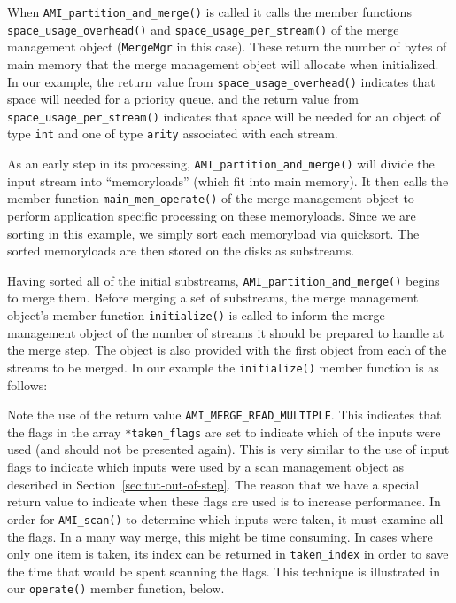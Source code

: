 When \lstinline|AMI_partition_and_merge()| is called it calls the
member functions \lstinline|space_usage_overhead()| and
\lstinline|space_usage_per_stream()| of the merge management object
(\lstinline|MergeMgr| in this case).  These return the number of bytes
of main memory that the merge management object will allocate when
initialized.  In our example, the return value from
\lstinline|space_usage_overhead()| indicates that space will needed
for a priority queue, and the return value from
\lstinline|space_usage_per_stream()| indicates that space
will be needed for an object of type \lstinline|int| and one of
type \lstinline|arity| associated with each stream.



As an early step in its processing,
\lstinline|AMI_partition_and_merge()| will divide the input stream
into ``memoryloads'' (which fit into main memory). It then calls the
member function \lstinline|main_mem_operate()| of the merge management
object to perform application specific processing on these
memoryloads.  Since we are sorting in this example, we simply sort
each memoryload via quicksort. The sorted memoryloads are then stored
on the disks as substreams.



Having sorted all of the initial substreams,
\lstinline|AMI_partition_and_merge()| begins to merge them.  Before
merging a set of substreams, the merge management object's member
function \lstinline|initialize()| is called to inform the merge
management object of the number of streams it should be prepared to
handle at the merge step.  The object is also provided with the first
object from each of the streams to be merged.  In our example the
\lstinline|initialize()| member function is as follows:



Note the use of the return value \lstinline|AMI_MERGE_READ_MULTIPLE|.
This indicates that the flags in the array \lstinline|*taken_flags|
are set to indicate which of the inputs were used (and should not be
presented again).  This is very similar to the use of input flags to
indicate which inputs were used by a scan management object as
described in Section~\ref{sec:tut-out-of-step}.  The reason that we
have a special return value to indicate when these flags are used is
to increase performance.  In order for \lstinline|AMI_scan()| to
determine which inputs were taken, it must examine all the flags.  In
a many way merge, this might be time consuming.  In cases where only
one item is taken, its index can be returned in
\lstinline|taken_index| in order to save the time that would be spent
scanning the flags.  This technique is illustrated in our
\lstinline|operate()| member function, below.

